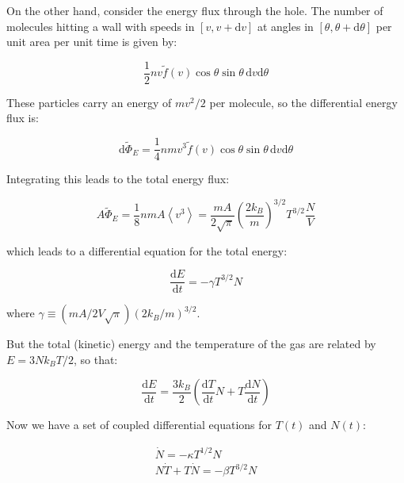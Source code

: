 \documentclass[12pt]{article}
\begin{document}
On the other hand, consider the energy flux through the hole. The number of molecules hitting a wall with speeds in $[v, v + \mathrm{d}v]$ at angles in $[\theta, \theta + \mathrm{d}\theta]$ per unit area per unit time is given by:

\begin{equation}
    \frac{1}{2} nv \tilde{f}(v) \cos{\theta} \sin{\theta} \, \mathrm{d}v \mathrm{d}\theta
\end{equation}

These particles carry an energy of $mv^{2}/2$ per molecule, so the differential energy flux is:

\begin{equation}
    \mathrm{d}\tilde{\Phi}_{E} = \frac{1}{4} nmv^{3} \tilde{f}(v) \cos{\theta} \sin{\theta} \, \mathrm{d}v \mathrm{d}\theta
\end{equation}

Integrating this leads to the total energy flux:

\begin{equation}
    A\tilde{\Phi}_{E} = \frac{1}{8} nmA \left\langle v^{3} \right\rangle = \frac{mA}{2\sqrt{\pi}} \left( \frac{2k_{B}}{m} \right)^{3/2} T^{3/2} \frac{N}{V}
\end{equation}

which leads to a differential equation for the total energy:

\begin{equation}
    \frac{\mathrm{d}E}{\mathrm{d}t} = -\gamma T^{3/2} N
\end{equation}

where $\gamma \equiv (mA/2V\sqrt{\pi}) (2k_{B}/m)^{3/2}$.

But the total (kinetic) energy and the temperature of the gas are related by $E = 3Nk_{B}T/2$, so that:

\begin{equation}
    \frac{\mathrm{d}E}{\mathrm{d}t} = \frac{3k_{B}}{2} \left( \frac{\mathrm{d}T}{\mathrm{d}t} N + T \frac{\mathrm{d}N}{\mathrm{d}t} \right)
\end{equation}

Now we have a set of coupled differential equations for $T(t)$ and $N(t)$:

\begin{equation}
    \begin{split}
        \dot{N} = -\kappa T^{1/2} N \\
        N\dot{T} + T\dot{N} = -\beta T^{3/2} N
    \end{split}
\end{equation}
\end{document}
